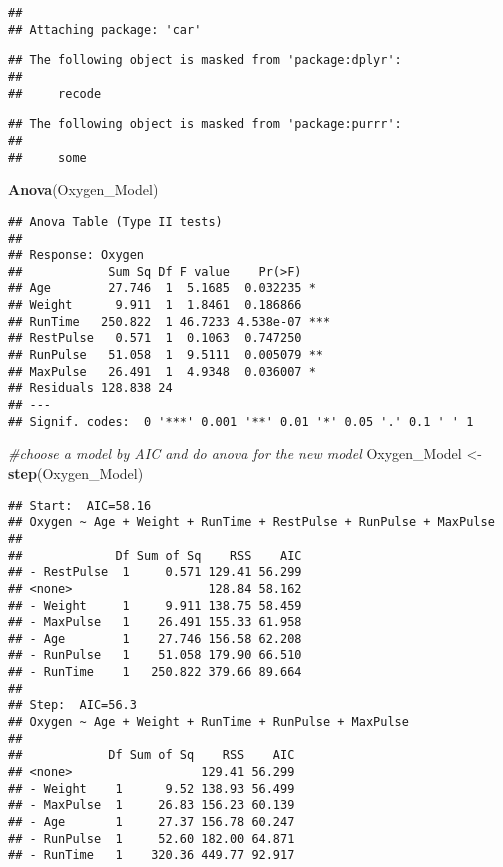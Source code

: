 \documentclass[]{article}
\newenvironment{Shaded}{\begin{snugshade}}{\end{snugshade}}
\newcommand{\KeywordTok}[1]{\textcolor[rgb]{0.13,0.29,0.53}{\textbf{#1}}}
\newcommand{\StringTok}[1]{\textcolor[rgb]{0.31,0.60,0.02}{#1}}
\newcommand{\CommentTok}[1]{\textcolor[rgb]{0.56,0.35,0.01}{\textit{#1}}}
\newcommand{\NormalTok}[1]{#1}
\begin{document}
\begin{verbatim}
## 
## Attaching package: 'car'
\end{verbatim}

\begin{verbatim}
## The following object is masked from 'package:dplyr':
## 
##     recode
\end{verbatim}

\begin{verbatim}
## The following object is masked from 'package:purrr':
## 
##     some
\end{verbatim}

\begin{Shaded}
\begin{Highlighting}[]
\KeywordTok{Anova}\NormalTok{(Oxygen_Model)}
\end{Highlighting}
\end{Shaded}

\begin{verbatim}
## Anova Table (Type II tests)
## 
## Response: Oxygen
##            Sum Sq Df F value    Pr(>F)    
## Age        27.746  1  5.1685  0.032235 *  
## Weight      9.911  1  1.8461  0.186866    
## RunTime   250.822  1 46.7233 4.538e-07 ***
## RestPulse   0.571  1  0.1063  0.747250    
## RunPulse   51.058  1  9.5111  0.005079 ** 
## MaxPulse   26.491  1  4.9348  0.036007 *  
## Residuals 128.838 24                      
## ---
## Signif. codes:  0 '***' 0.001 '**' 0.01 '*' 0.05 '.' 0.1 ' ' 1
\end{verbatim}

\begin{Shaded}
\begin{Highlighting}[]
\CommentTok{#choose a model by AIC and do anova for the new model}
\NormalTok{Oxygen_Model <-}\StringTok{ }\KeywordTok{step}\NormalTok{(Oxygen_Model)}
\end{Highlighting}
\end{Shaded}

\begin{verbatim}
## Start:  AIC=58.16
## Oxygen ~ Age + Weight + RunTime + RestPulse + RunPulse + MaxPulse
## 
##             Df Sum of Sq    RSS    AIC
## - RestPulse  1     0.571 129.41 56.299
## <none>                   128.84 58.162
## - Weight     1     9.911 138.75 58.459
## - MaxPulse   1    26.491 155.33 61.958
## - Age        1    27.746 156.58 62.208
## - RunPulse   1    51.058 179.90 66.510
## - RunTime    1   250.822 379.66 89.664
## 
## Step:  AIC=56.3
## Oxygen ~ Age + Weight + RunTime + RunPulse + MaxPulse
## 
##            Df Sum of Sq    RSS    AIC
## <none>                  129.41 56.299
## - Weight    1      9.52 138.93 56.499
## - MaxPulse  1     26.83 156.23 60.139
## - Age       1     27.37 156.78 60.247
## - RunPulse  1     52.60 182.00 64.871
## - RunTime   1    320.36 449.77 92.917
\end{verbatim}
\end{document}
